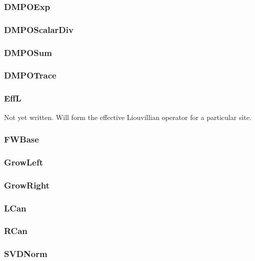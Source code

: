  \subsubsection{DMPOExp}
 
 \subsubsection{DMPOScalarDiv}
 
 \subsubsection{DMPOSum}
 
 \subsubsection{DMPOTrace}
 
 \subsubsection{EffL}
 Not yet written. Will form the effective Liouvillian operator for a particular site.
 
 \subsubsection{FWBase}
 
 \subsubsection{GrowLeft}
 
 \subsubsection{GrowRight}
 
 \subsubsection{LCan}
 
 \subsubsection{RCan}
 
 \subsubsection{SVDNorm}